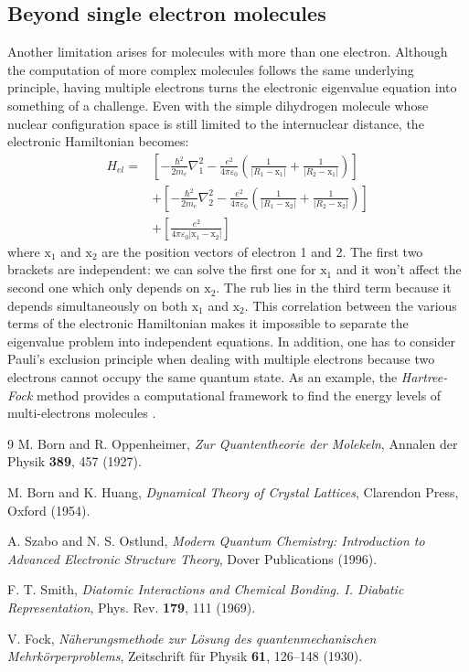 \documentclass[11pt,a4paper]{article}
\begin{document}
\subsection{Beyond single electron molecules}
Another limitation arises for molecules with more than one electron. Although the computation of more complex molecules follows the same underlying principle, having multiple electrons turns the electronic eigenvalue equation into something of a challenge. Even with the simple dihydrogen molecule whose nuclear configuration space is still limited to the internuclear distance, the electronic Hamiltonian becomes:
\begin{equation*}
	\begin{split}
		H_{el} = & \left[ -\frac{\hbar^2}{2m_e} \nabla_1^2 - \frac{e^2}{4\pi\varepsilon_0} \left( \frac{1}{|R_1 - \mathrm{x}_1|} + \frac{1}{|R_2 - \mathrm{x}_1|} \right) \right] \\
		& + \left[ -\frac{\hbar^2}{2m_e} \nabla_2^2 - \frac{e^2}{4\pi\varepsilon_0} \left( \frac{1}{|R_1 - \mathrm{x}_2|} + \frac{1}{|R_2 - \mathrm{x}_2|} \right) \right] \\
		& + \left[ \frac{e^2}{4\pi\varepsilon_0 |\mathrm{x}_1 - \mathrm{x}_2|} \right]
	\end{split}
\end{equation*}
where $\mathrm{x}_1$ and $\mathrm{x}_2$ are the position vectors of electron 1 and 2. The first two brackets are independent: we can solve the first one for $\mathrm{x}_1$ and it won’t affect the second one which only depends on $\mathrm{x}_2$. The rub lies in the third term because it depends simultaneously on both $\mathrm{x}_1$ and $\mathrm{x}_2$. This correlation between the various terms of the electronic Hamiltonian makes it impossible to separate the eigenvalue problem into independent equations. In addition, one has to consider Pauli’s exclusion principle when dealing with multiple electrons because two electrons cannot occupy the same quantum state. As an example, the \emph{Hartree-Fock} method provides a computational framework to find the energy levels of multi-electrons molecules  \cite{Fock1930}.

\begin{thebibliography}{9}
M. Born and R. Oppenheimer, \emph{Zur Quantentheorie der Molekeln}, Annalen der Physik \textbf{389}, 457 (1927).

M. Born and K. Huang, \emph{Dynamical Theory of Crystal Lattices}, Clarendon Press, Oxford (1954).

A. Szabo and N. S. Ostlund, \emph{Modern Quantum Chemistry: Introduction to Advanced Electronic Structure Theory}, Dover Publications (1996).

 F. T. Smith, \emph{Diatomic Interactions and Chemical Bonding. I. Diabatic Representation}, Phys. Rev. \textbf{179}, 111 (1969).

 V. Fock, \emph{Näherungsmethode zur Lösung des quantenmechanischen Mehrkörperproblems}, Zeitschrift für Physik \textbf{61}, 126--148 (1930).
\end{thebibliography}
\end{document}
